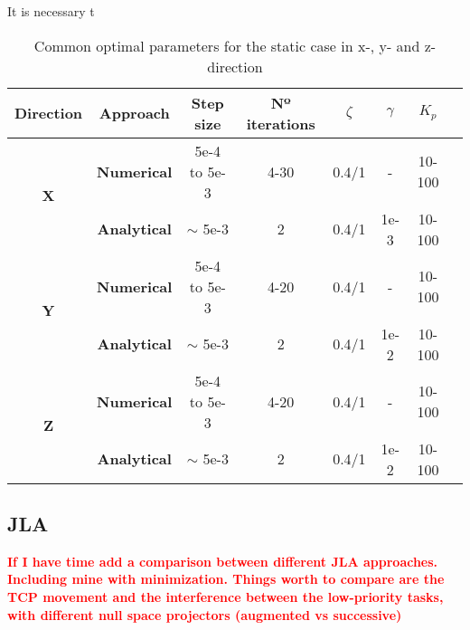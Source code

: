 \begin{table}[]It is necessary t
	\centering
	\caption{Common optimal parameters for the static case in x-, y- and z-direction}
	\label{table:table_SC}
	\begin{tabular}{|c|c|c|c|c|c|c|c|}
		\hline
		\textbf{Direction}          & \textbf{Approach}   & \textbf{Step size} & \textbf{Nº iterations} & \textbf{$\zeta$} & \textbf{$\gamma$} & \textbf{$K_p$}  \\ \hline
		\multirow{2}{*}{\textbf{X}} & \textbf{Numerical}  & 5e-4 to 5e-3       & 4-30                          & 0.4/1                   & -             & 10-100                    \\ 
		& \textbf{Analytical} & $\sim$ 5e-3       & 2                             & 0.4/1                   & 1e-3       & 10-100                          \\ \hline
		\multirow{2}{*}{\textbf{Y}} & \textbf{Numerical}  & 5e-4 to 5e-3       & 4-20                          & 0.4/1                  & -                    & 10-100               \\ 
		& \textbf{Analytical} & $\sim$ 5e-3       & 2                             & 0.4/1                  & 1e-2        & 10-100                        \\ \hline
		\multirow{2}{*}{\textbf{Z}} & \textbf{Numerical}  & 5e-4 to 5e-3       & 4-20                          & 0.4/1                   & -                         & 10-100           \\ 
		& \textbf{Analytical} & $\sim$ 5e-3       & 2                             & 0.4/1                  & 1e-2      & 10-100         \\ \hline                 
	\end{tabular}
\end{table}







\subsection{JLA}


\textcolor{red}{\textbf{If I have time add a comparison between different JLA approaches. Including mine with minimization. Things worth to compare are the TCP movement and the interference between the low-priority tasks, with different null space projectors (augmented vs successive)}}




